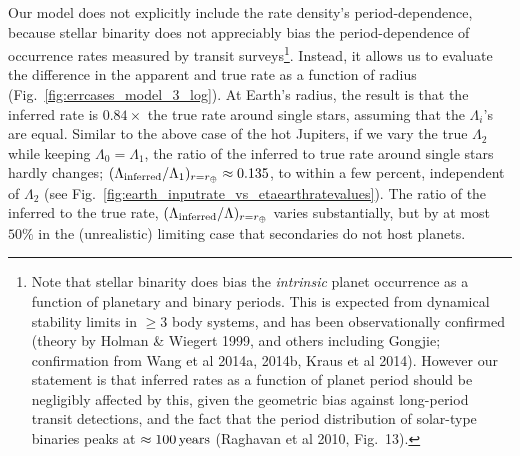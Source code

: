 Our model does not explicitly include the rate density's period-dependence, 
because stellar binarity does not appreciably bias the period-dependence of 
occurrence rates measured by transit surveys\footnote{
    Note that stellar binarity does bias the {\it intrinsic} planet 
    occurrence as a function of planetary and binary periods. This is expected 
    from dynamical stability limits in $\geq$3 body systems, and has been 
    observationally confirmed (theory by Holman \& Wiegert 1999, and others 
    including Gongjie; confirmation from Wang et al 2014a, 2014b, Kraus et al 
    2014). 
    However our statement is that inferred rates as a function of planet     
    period should be negligibly affected by this, given the geometric bias 
    against long-period transit detections, and the fact that the period 
    distribution of solar-type binaries peaks at $\approx 100\,{\rm years}$ 
    (Raghavan et al 2010, Fig.~13).
}.
Instead, it allows us to evaluate the difference in the apparent and true rate 
as a function of radius 
(Fig.~\ref{fig:errcases_model_3_log}).
At Earth's radius, the result is that the inferred rate is $0.84\times$ the 
true rate around single stars, assuming that the $\Lambda_i$'s are equal.
Similar to the above case of the hot Jupiters, if we vary the true $\Lambda_2$ 
while keeping $\Lambda_0 = \Lambda_1$, the ratio of the inferred to true rate 
around single stars hardly 
changes; $(\Lambda_{\rm inferred}/\Lambda_1)_{r=r_\oplus} \approx 0.135$, to 
within a few percent, independent of $\Lambda_2$ (see 
Fig.~\ref{fig:earth_inputrate_vs_etaearthratevalues}).
The ratio of the inferred to the true rate, $(\Lambda_{\rm 
inferred}/\Lambda)_{r=r_\oplus}$ varies substantially, but by at most $50\%$ 
in the (unrealistic) limiting case that secondaries do not host planets.


